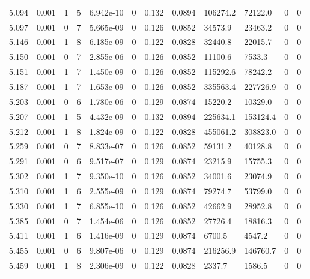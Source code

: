 \documentclass[preview]{standalone}
\begin{document}
{{{{{{\begin{tabular}{L{1.2cm}C{1.2cm} C{0.3cm}C{0.5cm} C{1.4cm}C{1.4cm} C{1.4cm}C{1.4cm} C{1.6cm}C{1.6cm} C{1.6cm}C{1.6cm}}
  5.094  &  0.001  & 1     &  5 &  6.942e-10  & 0  &  0.132&   0.0894& 106274.2 & 72122.0   &  0 & 0  \\ 
  5.097  &  0.001  & 0     &  7 &  5.665e-09  & 0  &  0.126&   0.0852& 34573.9 & 23463.2   &  0 & 0  \\ 
  5.146  &  0.001  & 1     &  8 &  6.185e-09  & 0  &  0.122&   0.0828& 32440.8 & 22015.7   &  0 & 0  \\ 
  5.150  &  0.001  & 0     &  7 &  2.855e-06  & 0  &  0.126&   0.0852& 11100.6 & 7533.3   &  0 & 0  \\ 
  5.151  &  0.001  & 1     &  7 &  1.450e-09  & 0  &  0.126&   0.0852& 115292.6 & 78242.2   &  0 & 0  \\ 
  5.187  &  0.001  & 1     &  7 &  1.653e-09  & 0  &  0.126&   0.0852& 335563.4 & 227726.9   &  0 & 0  \\ 
  5.203  &  0.001  & 0     &  6 &  1.780e-06  & 0  &  0.129&   0.0874& 15220.2 & 10329.0   &  0 & 0  \\ 
  5.207  &  0.001  & 1     &  5 &  4.432e-09  & 0  &  0.132&   0.0894& 225634.1 & 153124.4   &  0 & 0  \\ 
  5.212  &  0.001  & 1     &  8 &  1.824e-09  & 0  &  0.122&   0.0828& 455061.2 & 308823.0   &  0 & 0  \\ 
  5.259  &  0.001  & 0     &  7 &  8.833e-07  & 0  &  0.126&   0.0852& 59131.2 & 40128.8   &  0 & 0  \\ 
  5.291  &  0.001  & 0     &  6 &  9.517e-07  & 0  &  0.129&   0.0874& 23215.9 & 15755.3   &  0 & 0  \\ 
  5.302  &  0.001  & 1     &  7 &  9.350e-10  & 0  &  0.126&   0.0852& 34001.6 & 23074.9   &  0 & 0  \\ 
  5.310  &  0.001  & 1     &  6 &  2.555e-09  & 0  &  0.129&   0.0874& 79274.7 & 53799.0   &  0 & 0  \\ 
  5.330  &  0.001  & 1     &  7 &  6.855e-10  & 0  &  0.126&   0.0852& 42662.9 & 28952.8   &  0 & 0  \\ 
  5.385  &  0.001  & 0     &  7 &  1.454e-06  & 0  &  0.126&   0.0852& 27726.4 & 18816.3   &  0 & 0  \\ 
  5.411  &  0.001  & 1     &  6 &  1.416e-09  & 0  &  0.129&   0.0874& 6700.5 & 4547.2   &  0 & 0  \\ 
  5.455  &  0.001  & 0     &  6 &  9.807e-06  & 0  &  0.129&   0.0874& 216256.9 & 146760.7   &  0 & 0  \\ 
  5.459  &  0.001  & 1     &  8 &  2.306e-09  & 0  &  0.122&   0.0828& 2337.7 & 1586.5   &  0 & 0  \\ 

\end{tabular}}}}}}}
\end{document}
